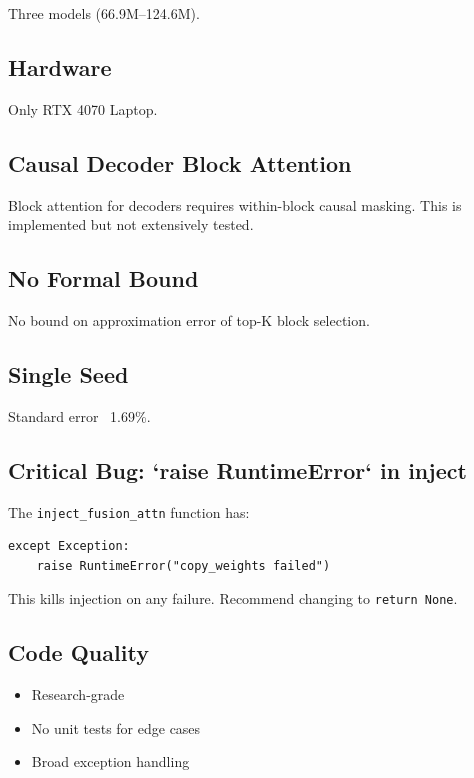 Three models (66.9M--124.6M).

\subsection{Hardware}

Only RTX 4070 Laptop.

\subsection{Causal Decoder Block Attention}

Block attention for decoders requires within-block causal masking. This is 
implemented but not extensively tested.

\subsection{No Formal Bound}

No bound on approximation error of top-K block selection.

\subsection{Single Seed}

Standard error ~1.69\%.

\subsection{Critical Bug: `raise RuntimeError` in inject}

The \texttt{inject\_fusion\_attn} function has:

\begin{lstlisting}
except Exception:
    raise RuntimeError("copy_weights failed")
\end{lstlisting}

This kills injection on any failure. Recommend changing to \texttt{return None}.

\subsection{Code Quality}

\begin{itemize}
\item Research-grade
\item No unit tests for edge cases
\item Broad exception handling

\end{itemize}
